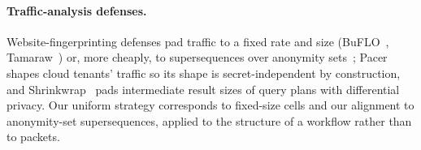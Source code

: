 \paragraph{Traffic-analysis defenses.} Website-fingerprinting defenses pad traffic to a fixed rate and size (BuFLO~\cite{dyer2012peekaboo}, Tamaraw~\cite{cai2014tamaraw}) or, more cheaply, to supersequences over anonymity sets~\cite{wang2014supersequence}; Pacer~\cite{mehta2022pacer} shapes cloud tenants' traffic so its shape is secret-independent by construction, and Shrinkwrap~\cite{bater2018shrinkwrap} pads intermediate result sizes of query plans with differential privacy. Our uniform strategy corresponds to fixed-size cells and our alignment to anonymity-set supersequences, applied to the structure of a workflow rather than to packets.
